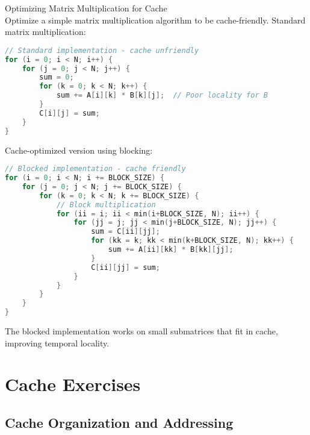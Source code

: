 \begin{example2}{Optimizing Matrix Multiplication for Cache}\\
Optimize a simple matrix multiplication algorithm to be cache-friendly.
\tcblower
Standard matrix multiplication:
\begin{lstlisting}[language=C, style=basesmol]
// Standard implementation - cache unfriendly
for (i = 0; i < N; i++) {
    for (j = 0; j < N; j++) {
        sum = 0;
        for (k = 0; k < N; k++) {
            sum += A[i][k] * B[k][j];  // Poor locality for B
        }
        C[i][j] = sum;
    }
}
\end{lstlisting}

Cache-optimized version using blocking:
\begin{lstlisting}[language=C, style=basesmol]
// Blocked implementation - cache friendly
for (i = 0; i < N; i += BLOCK_SIZE) {
    for (j = 0; j < N; j += BLOCK_SIZE) {
        for (k = 0; k < N; k += BLOCK_SIZE) {
            // Block multiplication
            for (ii = i; ii < min(i+BLOCK_SIZE, N); ii++) {
                for (jj = j; jj < min(j+BLOCK_SIZE, N); jj++) {
                    sum = C[ii][jj];
                    for (kk = k; kk < min(k+BLOCK_SIZE, N); kk++) {
                        sum += A[ii][kk] * B[kk][jj];
                    }
                    C[ii][jj] = sum;
                }
            }
        }
    }
}
\end{lstlisting}

The blocked implementation works on small submatrices that fit in cache, improving temporal locality.
\end{example2}

\section{Cache Exercises}

\subsection{Cache Organization and Addressing}

